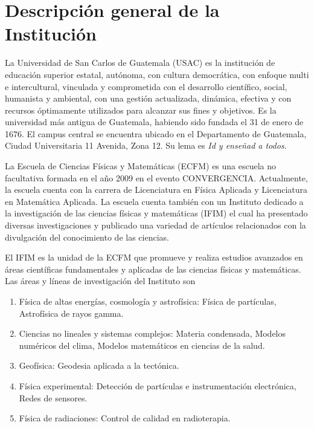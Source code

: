 \documentclass[titlepage,11pt]{article}
\begin{document}
\newpage
\pagestyle{plain}
\tableofcontents
\newpage


\section{Descripción general de la Institución}
\label{sec:institucion}
La Universidad de San Carlos de Guatemala (USAC) es la institución de
educación superior estatal, autónoma, con cultura democrática, con enfoque
multi e intercultural, vinculada y comprometida con el desarrollo científico,
social, humanista y ambiental, con una gestión actualizada, dinámica, efectiva
y con recursos óptimamente utilizados para alcanzar sus fines y objetivos. Es
la universidad más antigua de Guatemala, habiendo sido fundada el 31 de enero
de 1676. El campus central se encuentra ubicado en el Departamento de
Guatemala, Ciudad Universitaria 11 Avenida, Zona 12. Su lema es \emph{Id y
  enseñad a todos}.

La Escuela de Ciencias Físicas y Matemáticas (ECFM) es una escuela no
facultativa formada en el año 2009 en el evento CONVERGENCIA. Actualmente, la
escuela cuenta con la carrera de Licenciatura en Física Aplicada y
Licenciatura en Matemática Aplicada. La escuela cuenta también con un
Instituto dedicado a la investigación de las ciencias físicas y matemáticas
(IFIM) el cual ha presentado diversas investigaciones y publicado una variedad
de artículos relacionados con la divulgación del conocimiento de las ciencias.

El IFIM es la unidad de la ECFM que promueve y realiza estudios avanzados en
áreas científicas fundamentales y aplicadas de las ciencias físicas y
matemáticas.  Las áreas y líneas de investigación del Instituto son
\begin{enumerate}
\item Física de altas energías, cosmología y astrofísica: Física de
  partículas, Astrofísica de rayos gamma.
\item Ciencias no lineales y sistemas complejos: Materia condensada, Modelos
  numéricos del clima, Modelos matemáticos en ciencias de la salud.
\item Geofísica: Geodesia aplicada a la tectónica.
\item Física experimental: Detección de partículas e instrumentación
  electrónica, Redes de sensores.
\item Física de radiaciones: Control de calidad en radioterapia.
\end{enumerate}
\end{document}
